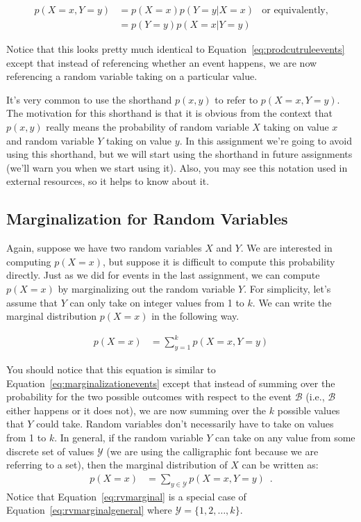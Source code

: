\documentclass[assignment02_Solutions]{subfiles}
\begin{document}
\begin{align}
p(X = x, Y = y) &= p(X=x)p(Y=y | X=x) & \mbox{or equivalently,}\\
&= p(Y=y)p(X=x|Y=y) \nonumber
\end{align}

Notice that this looks pretty much identical to Equation~\ref{eq:prodcutruleevents} except that instead of referencing whether an event happens, we are now referencing a random variable taking on a particular value.

\begin{notice}
It's very common to use the shorthand $p(x, y)$ to refer to $p(X = x, Y = y)$.  The motivation for this shorthand is that it is obvious from the context that $p(x, y)$ really means the probability of random variable $X$ taking on value $x$ and random variable $Y$ taking on value $y$.  In this assignment we're going to avoid using this shorthand, but we will start using the shorthand in future assignments (we'll warn you when we start using it).  Also, you may see this notation used in external resources, so it helps to know about it.
\end{notice}

\subsection{Marginalization for Random Variables}
Again, suppose we have two random variables $X$ and $Y$.  We are interested in computing $p(X = x)$, but suppose it is difficult to compute this probability directly.  Just as we did for events in the last assignment, we can compute $p(X=x)$ by marginalizing out the random variable $Y$.  For simplicity, let's assume that $Y$ can only take on integer values from 1 to $k$.  We can write the marginal distribution $p(X=x)$ in the following way.

\begin{align}
p(X=x) &= \sum_{y=1}^k p(X=x, Y=y)\label{eq:rvmarginal}
\end{align}

You should notice that this equation is similar to Equation~\ref{eq:marginalizationevents} except that instead of summing over the probability for the two possible outcomes with respect to the event $\mathcal{B}$ (i.e., $\mathcal{B}$ either happens or it does not), we are now summing over the $k$ possible values that $Y$ could take.  Random variables don't necessarily have to take on values from 1 to $k$.  In general, if the random variable $Y$ can take on any value from some discrete set of values $\mathcal{Y}$ (we are using the calligraphic font because we are referring to a set), then the marginal distribution of $X$ can be written as:
\begin{align}
p(X=x) &= \sum_{y \in \mathcal{Y}} p(X=x, Y=y) \enspace . \label{eq:rvmarginalgeneral}
\end{align}
Notice that Equation~\ref{eq:rvmarginal} is a special case of Equation~\ref{eq:rvmarginalgeneral} where $\mathcal{Y} = \{1, 2, \ldots, k\}$.
\end{document}
